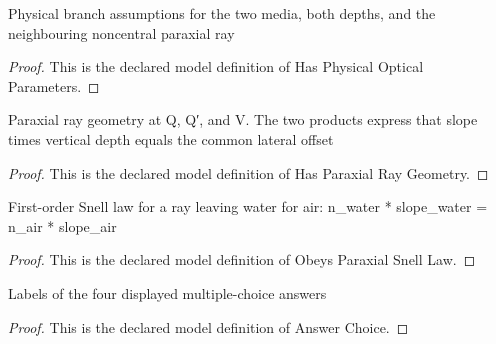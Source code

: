 \begin{definition}
  \label{def:physics:phyx-mini-0042:phyxminiproblems-problemphyxmini0042-hasphysicalopticalparameters}
  Physical branch assumptions for the two media, both depths, and the neighbouring noncentral paraxial ray
\end{definition}
\begin{proof}
  This is the declared model definition of Has Physical Optical Parameters.
\end{proof}
\begin{definition}
  \label{def:physics:phyx-mini-0042:phyxminiproblems-problemphyxmini0042-hasparaxialraygeometry}
  Paraxial ray geometry at Q, Q′, and V. The two products express that slope times vertical depth equals the common lateral offset
\end{definition}
\begin{proof}
  This is the declared model definition of Has Paraxial Ray Geometry.
\end{proof}
\begin{definition}
  \label{def:physics:phyx-mini-0042:phyxminiproblems-problemphyxmini0042-obeysparaxialsnelllaw}
  First-order Snell law for a ray leaving water for air: n\_water * slope\_water = n\_air * slope\_air
\end{definition}
\begin{proof}
  This is the declared model definition of Obeys Paraxial Snell Law.
\end{proof}
\begin{definition}
  \label{def:physics:phyx-mini-0042:phyxminiproblems-problemphyxmini0042-answerchoice}
  Labels of the four displayed multiple-choice answers
\end{definition}
\begin{proof}
  This is the declared model definition of Answer Choice.
\end{proof}
